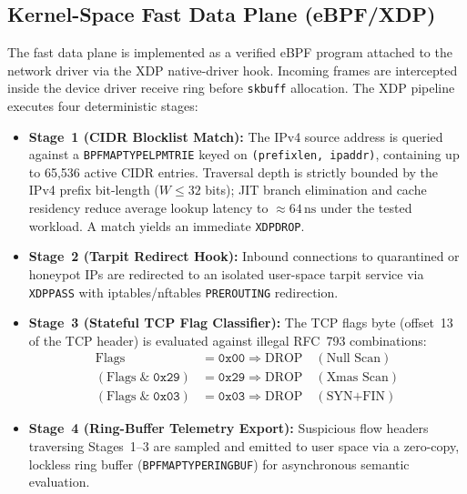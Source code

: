 \documentclass[journal]{IEEEtran}
\renewcommand{\_}{\textunderscore\allowbreak}
\begin{document}
\subsection{Kernel-Space Fast Data Plane (eBPF/XDP)}
The fast data plane is implemented as a verified eBPF program attached to the
network driver via the XDP native-driver hook. Incoming frames are intercepted
inside the device driver receive ring before \texttt{sk\_buff} allocation. The
XDP pipeline executes four deterministic stages:
\begin{itemize}
  \item \textbf{Stage~1 (CIDR Blocklist Match):} The IPv4 source address is
    queried against a \texttt{BPF\_MAP\_TYPE\_LPM\_TRIE} keyed on
    \texttt{(prefix\_len, ip\_addr)}, containing up to 65{,}536 active CIDR
    entries. Traversal depth is strictly bounded by the IPv4 prefix bit-length
    ($W \le 32$ bits); JIT branch elimination and cache residency reduce average
    lookup latency to ${\approx}64\,\text{ns}$ under the tested workload. A match
    yields an immediate \texttt{XDP\_DROP}.

  \item \textbf{Stage~2 (Tarpit Redirect Hook):} Inbound connections to
    quarantined or honeypot IPs are redirected to an isolated user-space tarpit
    service via \texttt{XDP\_PASS} with iptables/nftables \texttt{PREROUTING}
    redirection.

  \item \textbf{Stage~3 (Stateful TCP Flag Classifier):} The TCP flags byte
    (offset~13 of the TCP header) is evaluated against illegal RFC~793 combinations:
    \begin{align}
      \text{Flags} &= \mathtt{0x00} \Rightarrow \text{DROP} \quad (\text{Null Scan}) \\
      (\text{Flags} \;\&\; \mathtt{0x29}) &= \mathtt{0x29} \Rightarrow \text{DROP} \quad (\text{Xmas Scan}) \\
      (\text{Flags} \;\&\; \mathtt{0x03}) &= \mathtt{0x03} \Rightarrow \text{DROP} \quad (\text{SYN+FIN})
    \end{align}

  \item \textbf{Stage~4 (Ring-Buffer Telemetry Export):} Suspicious flow headers
    traversing Stages~1--3 are sampled and emitted to user space via a zero-copy,
    lockless ring buffer (\texttt{BPF\_MAP\_TYPE\_RINGBUF}) for asynchronous
    semantic evaluation.
\end{itemize}
\end{document}
